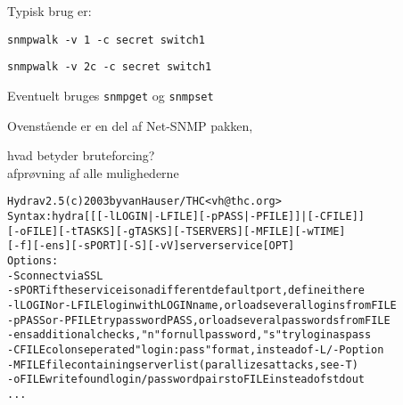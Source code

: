 \documentclass[Screen16to9,17pt]{foils}
\begin{document}

\begin{list1}
\item Typisk brug er:
\item \verb+snmpwalk -v 1 -c secret switch1+
\item \verb+snmpwalk -v 2c -c secret switch1+
\item Eventuelt bruges \verb+snmpget+ og \verb+snmpset+
\item Ovenstående er en del af Net-SNMP pakken, 
\end{list1}





\begin{list1}
\item hvad betyder bruteforcing?\\
afprøvning af alle mulighederne
\end{list1}

\begin{alltt}
\small
Hydra v2.5 (c) 2003 by van Hauser / THC <vh@thc.org>
Syntax: hydra [[[-l LOGIN|-L FILE] [-p PASS|-P FILE]] | [-C FILE]]
[-o FILE] [-t TASKS] [-g TASKS] [-T SERVERS] [-M FILE] [-w TIME]
[-f] [-e ns] [-s PORT] [-S] [-vV] server service [OPT]
Options:
  -S        connect via SSL
  -s PORT   if the service is on a different default port, define it here
  -l LOGIN  or -L FILE login with LOGIN name, or load several logins from FILE
  -p PASS   or -P FILE try password PASS, or load several passwords from FILE
  -e ns     additional checks, "n" for null password, "s" try login as pass
  -C FILE   colon seperated "login:pass" format, instead of -L/-P option
  -M FILE   file containing server list (parallizes attacks, see -T)
  -o FILE   write found login/password pairs to FILE instead of stdout
...
\end{alltt}


\end{document}
